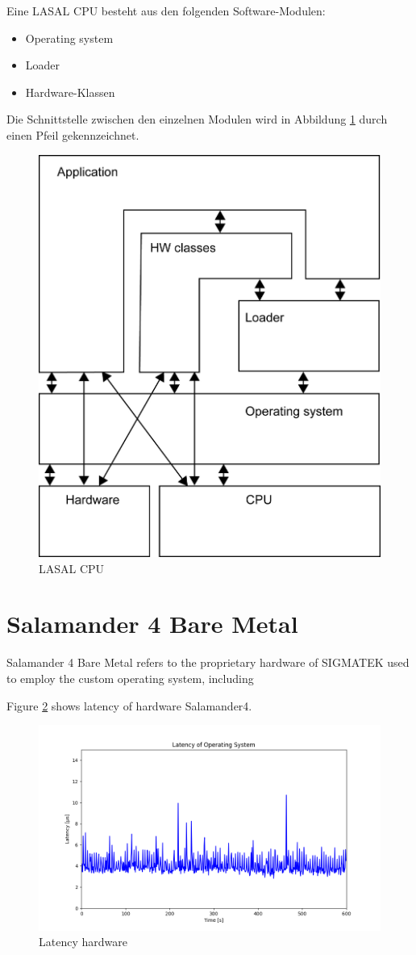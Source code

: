 \documentclass[MMR,Master,english]{twbook}
\begin{document}
Eine LASAL CPU besteht aus den folgenden Software-Modulen:
\begin{itemize}
	\item Operating system
	\item Loader
	\item Hardware-Klassen
\end{itemize}

Die Schnittstelle zwischen den einzelnen Modulen wird in Abbildung \ref{fig:lasal_cpu} durch einen Pfeil gekennzeichnet.

\begin{figure}[!h]
	\centering
	\includegraphics[width=0.5\columnwidth]{img/Software-Struktur_einer_LASAL_CPU.png}
	\caption[LASAL CPU]{LASAL CPU}
	\label{fig:lasal_cpu}
\end{figure}

\clearpage

\section{Salamander 4 Bare Metal}
Salamander 4 Bare Metal refers to the proprietary hardware of SIGMATEK used to employ the custom operating system, including

Figure \ref{fig:max_latency_hardware} shows latency of hardware Salamander4.
\begin{figure}[H]
	\centering
	\includegraphics[width=0.8\columnwidth]{img/max_latency_hardware.png}
	\caption[Latency hardware]{Latency hardware}
	\label{fig:max_latency_hardware}
\end{figure}
\clearpage
\end{document}
